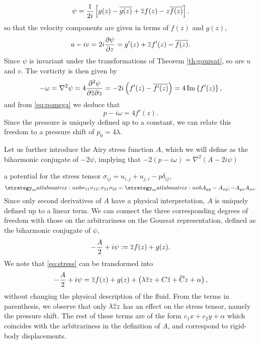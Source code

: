 \begin{equation}
\psi = \frac{1}{2i} \left[g(z) - {\overline{g(z)}} + {\overline{z}}f(z) - z{\overline{f(z)}}\right].
\end{equation}
so that the velocity components are given in terms of $f(z)$ and $g(z)$,
\begin{equation}
u-iv = 2i\frac{\partial \psi}{\partial z} = g'(z) + {\overline{z}} f'(z) - {\overline{f(z)}}.
\end{equation}
Since $\psi$ is invariant under the transformations of Theorem \ref{th:goursat}, so are $u$ and $v$. The vorticity is then given by
\begin{equation}
-\omega = \nabla^2 \psi =4\frac{\partial^2\psi}{\partial {\overline{z}}\partial z} = -2i \left( f'(z) - {\overline{f'(z)}}\right) = 4\Im\left\{f'(z)\right\},
\end{equation}
and from \eqref{eq:pomega} we deduce that
\begin{equation}
p-i\omega = 4 f'(z).
\end{equation}
Since the pressure is uniquely defined up to a constant, we can relate this freedom to a pressure shift of $p_0=4\lambda$. 


Let us further introduce the Airy stress function $A$, which we will define as the biharmonic conjugate of $-2\psi$, implying that $-2(p-i\omega) = \nabla^2 (A-2i\psi)$


a potential for the stress tensor $\sigma_{ij} = u_{i,j} + u_{j,i} -p \delta_{ij}$,
\begin{equation}
\matlabmatrix{\sigma_{11} \sigma_{12}; \sigma_{21} \sigma_{22}} = 
\matlabmatrix{A_{yy} -A_{xy}; -A_{yx} A_{xx}}.
\end{equation}
Since only second derivatives of $A$ have a physical interpretation, $A$ is uniquely defined up to a linear term. We can connect the three corresponding degrees of freedom with those on the arbitrariness on the Goursat representation, defined as the biharmonic conjugate of $\psi$,
\begin{equation}\label{eq:stress}
-\frac{A}{2}+i\psi := {\overline{z}}f(z) + g(z).
\end{equation}
We note that \eqref{eq:stress} can be transformed into
\begin{equation}
-\frac{A}{2}+i\psi = {\overline{z}}f(z) + g(z) + \left(\lambda {\overline{z}}z + C{\overline{z}} + {\overline{C}}z + \alpha \right), 
\end{equation}
without changing the physical description of the fluid. From the terms in parenthesis, we observe that only $\lambda {\overline{z}}z$ has an effect on the stress tensor, namely the pressure shift. The rest of these terms are of the form $c_1 x+c_2 y+\alpha$ which coincides with the arbitrariness in the definition of $A$, and correspond to rigid-body displacements.


